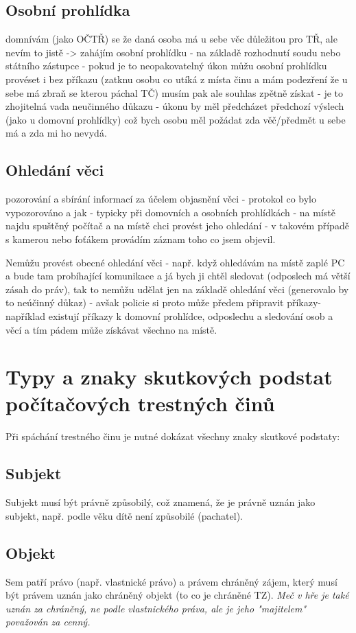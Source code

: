 \subsection*{Osobní prohlídka}
domnívám (jako OČTŘ) se že daná osoba má u sebe věc důležitou pro TŘ, ale nevím to jistě -> zahájím osobní prohlídku - na základě rozhodnutí soudu nebo státního zástupce - pokud je to neopakovatelný úkon můžu osobní prohlídku provéset i bez příkazu (zatknu osobu co utíká z místa činu a mám podezření že u sebe má zbraň se kterou páchal TČ) musím pak ale souhlas zpětně získat - je to zhojitelná vada neučinného důkazu - úkonu by měl předcházet předchozí výslech (jako u domovní prohlídky) což bych osobu měl požádat zda věč/předmět u sebe má a zda mi ho nevydá.

\subsection*{Ohledání věci}
pozorování a sbírání informací za účelem objasnění věci - protokol co bylo vypozorováno a jak - typicky při domovních a osobních prohlídkách - na místě najdu spuštěný počítač a na místě chci provést jeho ohledání - v takovém případě s kamerou nebo foťákem provádím záznam toho co jsem objevil.

Nemůžu provést obecné ohledání věci - např. když ohledávám na místě zaplé PC a bude tam probíhající komunikace a já bych ji chtěl sledovat (odposlech má větší zásah do práv), tak to nemůžu udělat jen na základě ohledání věci (generovalo by to neúčinný důkaz) - avšak policie si proto může předem připravit příkazy- například existují příkazy k domovní prohlídce, odposlechu a sledování osob a věcí a tím pádem může získávat všechno na místě.


\clearpage
\section{Typy a znaky skutkových podstat počítačových trestných činů}
Při spáchání trestného činu je nutné dokázat všechny znaky skutkové podstaty:

\subsection*{Subjekt}
Subjekt musí být právně způsobilý, což znamená, že je právně uznán jako subjekt, např. podle věku dítě není způsobilé (pachatel).

\subsection*{Objekt}
Sem patří právo (např. vlastnické právo) a právem chráněný zájem, který musí být právem uznán jako chráněný objekt (to co je chráněné TZ). \textit{Meč v hře je také uznán za chráněný, ne podle vlastnického práva, ale je jeho "majitelem" považován za cenný.}

